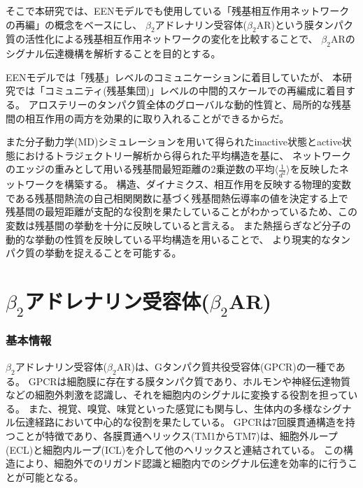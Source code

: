 
そこで本研究では、EENモデルでも使用している「残基相互作用ネットワークの再編」の概念をベースにし、
$\beta_2$アドレナリン受容体($\beta_2$AR)という膜タンパク質の活性化による残基相互作用ネットワークの変化を比較することで、
$\beta_2$ARのシグナル伝達機構を解析することを目的とする。

EENモデルでは「残基」レベルのコミュニケーションに着目していたが、
本研究では「コミュニティ(残基集団)」レベルの中間的スケールでの再編成に着目する。
アロステリーのタンパク質全体のグローバルな動的性質と、局所的な残基間の相互作用の両方を効果的に取り入れることができるからだ。

また分子動力学(MD)シミュレーションを用いて得られたinactive状態とactive状態におけるトラジェクトリー解析から得られた平均構造を基に、
ネットワークのエッジの重みとして用いる残基間最短距離の2乗逆数の平均$\langle \frac{1}{d^2} \rangle$を反映したネットワークを構築する。
構造、ダイナミクス、相互作用を反映する物理的変数である残基間熱流の自己相関関数に基づく残基間熱伝導率の値を決定する上で
残基間の最短距離が支配的な役割を果たしていることがわかっている\cite{Wang2024}ため、この変数は残基間の挙動を十分に反映していると言える。
また熱揺らぎなど分子の動的な挙動の性質を反映している平均構造を用いることで、
より現実的なタンパク質の挙動を捉えることを可能する。

\section{$\beta_2$アドレナリン受容体($\beta_2$AR)}
\label{sec:b2ar}

\subsubsection{基本情報}
$\beta_2$アドレナリン受容体($\beta_2$AR)は、Gタンパク質共役受容体(GPCR)の一種である。
GPCRは細胞膜に存在する膜タンパク質であり、ホルモンや神経伝達物質などの細胞外刺激を認識し、それを細胞内のシグナルに変換する役割を担っている。
また、視覚、嗅覚、味覚といった感覚にも関与し、生体内の多様なシグナル伝達経路において中心的な役割を果たしている。
GPCRは7回膜貫通構造を持つことが特徴であり、各膜貫通ヘリックス(TM1からTM7)は、細胞外ループ(ECL)と細胞内ループ(ICL)を介して他のヘリックスと連結されている。
この構造により、細胞外でのリガンド認識と細胞内でのシグナル伝達を効率的に行うことが可能となる。

